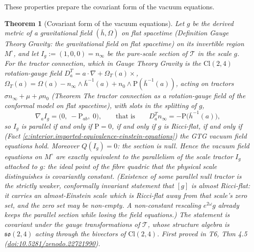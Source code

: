 \documentclass[11pt]{article}
\newtheorem{theorem}{Theorem}[section]
\theoremstyle{definition}
\theoremstyle{plain}
\providecommand{\Cl}{}\renewcommand{\Cl}{\mathrm{Cl}}
\providecommand{\Sch}{}\renewcommand{\Sch}{\mathrm{P}}
\providecommand{\hb}{}\renewcommand{\hb}{\bar{h}}
\providecommand{\nInf}{}\renewcommand{\nInf}{n_\infty}
\providecommand{\nO}{}\renewcommand{\nO}{n_0}
\begin{document}
These properties prepare the covariant form of the vacuum equations.

\begin{theorem}[Covariant form of the vacuum equations]\label{c:interior.covariant-form-vacuum-equations}
Let $g$ be the derived metric of a gravitational field $(\hb, \Omega)$ on flat spacetime (Definition \emph{Gauge Theory Gravity: the gravitational field on flat spacetime}) on its invertible region $M^\circ$, and let $I_g := (1, 0, 0) = \nInf$ be the pure-scale section of $\mathcal{T}$ in the scale $g$. For the tractor connection, which in Gauge Theory Gravity is the $\Cl(2,4)$ rotation-gauge field $D^{T}_{a} = a \cdot \nabla + \Omega_{T}(a)\times$, $\Omega_{T}(a) = \Omega(a) - \nInf \wedge \hb^{-1}(a) + \nO \wedge \Sch(\hb^{-1}(a))$, acting on tractors $\sigma\nInf + \mu + \rho\nO$ (Theorem \emph{The tractor connection as a rotation-gauge field of the conformal model on flat spacetime}), with slots in the splitting of $g$,
\[
\nabla_a I_g = \bigl(0,\; -\Sch_{ab},\; 0\bigr), \qquad\text{that is}\qquad D^{T}_{a}\nInf = -\Sch\bigl(\hb^{-1}(a)\bigr),
\]
so $I_g$ is parallel if and only if $\Sch = 0$, if and only if $g$ is Ricci-flat, if and only if (Fact \ref{c:interior.imported-equivalence-einstein-equations}) the GTG vacuum field equations hold. Moreover $Q(I_g) = 0$: the section is null. Hence the vacuum field equations on $M^\circ$ are exactly equivalent to the parallelism of the scale tractor $I_g$ attached to $g$: the ideal point of the fibre quadric that the physical scale distinguishes is covariantly constant. (Existence of \emph{some} parallel null tractor is the strictly weaker, conformally invariant statement that $[g]$ is almost Ricci-flat: it carries an almost-Einstein scale which is Ricci-flat away from that scale's zero set, and the zero set may be non-empty. A non-constant rescaling $e^{2\omega}g$ already keeps the parallel section while losing the field equations.) The statement is covariant under the gauge transformations of $\mathcal{T}$, whose structure algebra is $\mathfrak{so}(2,4)$ acting through the bivectors of $\Cl(2,4)$.
\emph{First proved in} T6, Thm 4.5 (\href{https://doi.org/10.5281/zenodo.22721990}{doi:10.5281/zenodo.22721990}).
\end{theorem}
\end{document}

